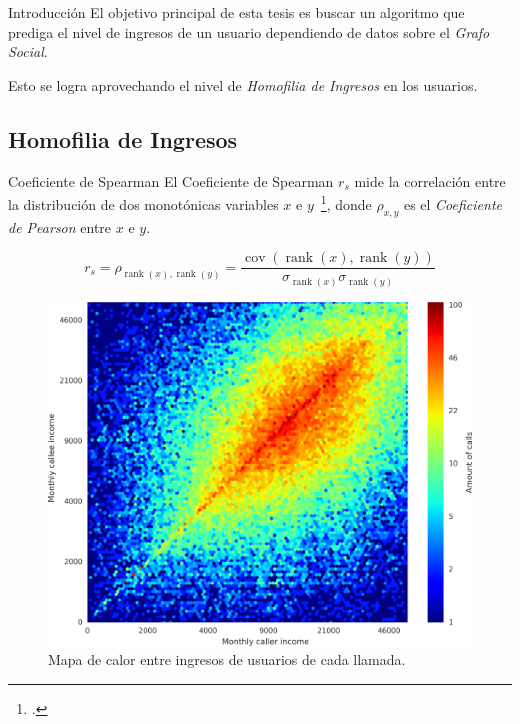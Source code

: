 \documentclass[usenames,dvipsnames,table]{beamer}
\DeclareMathOperator{\rank}{rank}
\DeclareMathOperator{\cov}{cov}
\begin{document}
\begin{frame}{Introducción}
	El objetivo principal de esta tesis es buscar un algoritmo que prediga el nivel de ingresos de un usuario dependiendo de datos sobre el \emph{Grafo Social}.

	Esto se logra aprovechando el nivel de \emph{Homofilia de Ingresos} en los usuarios.
\end{frame}


\subsection{Homofilia de Ingresos}

\begin{frame}{Coeficiente de Spearman}
	El Coeficiente de Spearman $r_s$ mide la correlación entre la distribución de dos monotónicas variables $x$ e $y$~\footcite{statistical_analysis}, donde $\rho_{x, y}$ es el \emph{Coeficiente de Pearson} entre $x$ e $y$.


	\begin{equation*}
		r_s = \rho_{\rank\left(x\right), \rank\left(y\right)} = \frac{\cov\left(\rank\left(x\right), \rank\left(y\right)\right)}{\sigma_{\rank(x)} \sigma_{\rank(y)}}
	\end{equation*}

\end{frame}

\begin{frame}
	\begin{figure}
		\includegraphics[width=.8\framewidth]{heatmap.png}
		\caption{Mapa de calor entre ingresos de usuarios de cada llamada.}
	\end{figure}
\end{frame}
\end{document}
